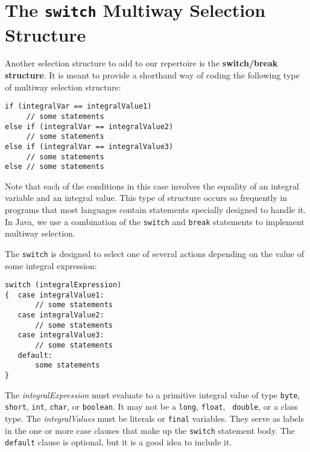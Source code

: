 \section{The {\tt switch} Multiway Selection Structure}
\label{the-multiway-selection-structure}

\noindent Another selection structure to add to our repertoire is the {\bf
switch/break structure}.  It is meant
to provide a
shorthand way of coding the following type of multiway selection
structure:

\begin{jjjlisting}
\begin{lstlisting}
if (integralVar == integralValue1)
     // some statements
else if (integralVar == integralValue2)
     // some statements
else if (integralVar == integralValue3)
     // some statements
else // some statements
\end{lstlisting}
\end{jjjlisting}

\noindent Note that each of the conditions in this case involves the
equality of an integral variable and an integral value.  This type of
structure occurs so frequently in programs that most languages contain
statements specially designed to handle it.  In Java, we use a
combination of the {\tt switch} and {\tt break} statements to
implement multiway selection.

The {\tt switch} is designed to select one of several actions
depending on the value of some integral expression:

\begin{jjjlisting}
\begin{lstlisting}
switch (integralExpression)
{  case integralValue1:
       // some statements
   case integralValue2:
       // some statements
   case integralValue3:
       // some statements
   default:
       some statements
}
\end{lstlisting}
\end{jjjlisting}

\noindent The {\it integralExpression} must evaluate to a primitive integral
value of type {\tt byte}, {\tt short}, {\tt int}, {\tt char},
or {\tt boolean}. It may not be a {\tt long}, {\tt float}, {\tt
double}, or a class type.  The {\it integralValues} must be literals
or {\tt final} variables.  They serve as labels in the one or more
case clauses that make up the {\tt switch} statement body.  The {\tt
default} clause is optional, but it is a good idea to include it.

